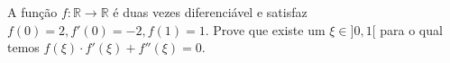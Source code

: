 A função \(f\colon  \mathbb{R}\to\mathbb{R}\) é duas vezes diferenciável e satisfaz \(f(0)=2,f'(0)=-2,f(1)=1\). Prove que existe um \(\xi \in ]0,1[\) para o qual temos \(f(\xi)\cdot f'(\xi)+f''(\xi)=0\).
